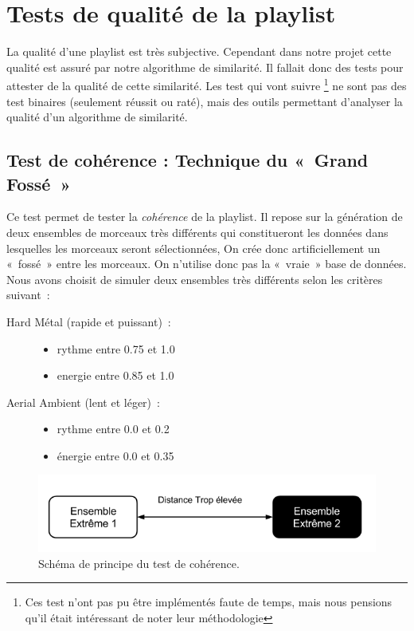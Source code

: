 \section{Tests de qualité de la playlist}
\label{tests:qualite}


La qualité d'une playlist est très subjective. Cependant dans notre projet cette
qualité est assuré par notre algorithme de similarité. Il fallait donc des tests
pour attester de la qualité de cette similarité. Les test qui vont suivre
\footnote{Ces test n'ont pas pu être implémentés faute de temps, mais nous
pensions qu'il était intéressant de noter leur méthodologie} ne sont pas des
test binaires (seulement réussit ou raté), mais des outils permettant d'analyser 
la qualité d'un algorithme de similarité.

\subsection{Test de cohérence : Technique du «~Grand Fossé~»}
\label{tests:qualite:coherence-fosse}

Ce test permet de tester la \emph{cohérence} de la playlist. Il repose sur la
génération de deux ensembles de morceaux très différents qui constitueront les
données dans lesquelles les morceaux seront sélectionnées, On crée donc
artificiellement un «~fossé~» entre les morceaux. On n'utilise donc pas la
«~vraie~» base de données. Nous avons choisit de simuler deux ensembles très
différents selon les critères suivant~:

\begin{description}

\item[Hard Métal (rapide et puissant)~:] \hfill
\begin{itemize}
  \item rythme entre 0.75 et 1.0
  \item energie entre 0.85 et 1.0
\end{itemize}

\item[Aerial Ambient (lent et léger)~:] \hfill
\begin{itemize}
  \item rythme entre 0.0 et 0.2
  \item énergie entre 0.0 et 0.35
\end{itemize}

\end{description}

\begin{figure}[H]
\includegraphics[width=\textwidth]{data/tests/test-coherence-fosse.png}
\caption{Schéma de principe du test de cohérence.}
\end{figure}

